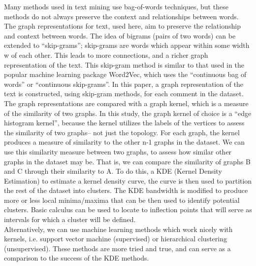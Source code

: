 Many methods used in text mining use bag-of-words techniques, but these methods do not always preserve the context and relationships between words. The graph representations for text, used here, aim to preserve the relationship and context between words. The idea of bigrams (pairs of two words) can be extended to “skip-grams”; skip-grams are words which appear within some width w of each other. This leads to more connections, and a richer graph representation of the text. This skip-gram method is similar to that used in the popular machine learning package Word2Vec, which uses the “continuous bag of words” or “continuous skip-grams”. In this paper, a graph representation of the text is constructed, using skip-gram methods, for each comment in the dataset. \\
The graph representations are compared with a graph kernel, which is a measure of the similarity of two graphs. In this study, the graph kernel of choice is a “edge histogram kernel”, because the kernel utilizes the labels of the vertices to assess the similarity of two graphs– not just the topology. For each graph, the kernel produces a measure of similarity to the other n-1 graphs in the dataset. We can use this similarity measure between two graphs, to assess how similar other graphs in the dataset may be. That is, we can compare the similarity of graphs B and C through their similarity to A. To do this, a KDE (Kernel Density Estimation) to estimate a kernel density curve, the curve is then used to partition the rest of the dataset into clusters. The KDE bandwidth is modified to produce more or less local minima/maxima that can be then used to identify potential clusters. Basic calculus can be used to locate to inflection points that will serve as intervals for which a cluster will be defined. \\
Alternatively, we can use machine learning methods which work nicely with kernels, i.e. support vector machine (supervised) or hierarchical clustering (unsupervised). These methods are more tried and true, and can serve as a comparison to the success of the KDE methods.\\
